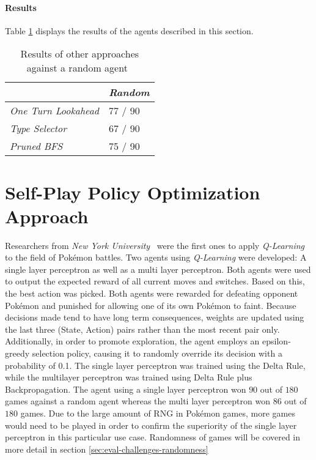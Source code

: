 \paragraph{Results}
Table \ref{tbl:AI-Comp-Results} displays the results of the agents described in this section. 
\begin{table}[h]
    \centering
        \begin{tabular}{|l|l|}
            \hline
            & \emph{Random} \\
            \hline
            \emph{One Turn Lookahead} & 77 / 90 \\
            \hline
            \emph{Type Selector} & 67 / 90 \\
            \hline
            \emph{Pruned \ac{BFS}} & 75 / 90 \\
            \hline
        \end{tabular}
        \caption{Results of other approaches against a random agent~\autocite{Lee_Togelius_2017}}
        \label{tbl:AI-Comp-Results}
\end{table}

\section{Self-Play Policy Optimization Approach}
Researchers from \textit{New York University}~\autocite{Lee_Togelius_2017} were the first ones to apply
\textit{Q-Learning} to the field of Pokémon battles. Two agents using \textit{Q-Learning}
were developed: A single layer perceptron as well as a multi layer perceptron. Both agents were 
used to output the expected reward of all current moves and switches. Based on this, the best 
action was picked. Both agents were rewarded for defeating opponent Pokémon and punished for 
allowing one of its own Pokémon to faint. Because decisions made tend to have long term consequences, 
weights are updated using the last three (State, Action) pairs rather than the most recent pair only.
Additionally, in order to promote exploration, the agent employs an epsilon-greedy selection policy, 
causing it to randomly override its decision with a probability of 0.1. The single layer perceptron 
was trained using the Delta Rule, while the multilayer perceptron was trained using Delta Rule 
plus Backpropagation. The agent using a single layer perceptron won $90$ out of $180$ games against a
random agent whereas the multi layer perceptron won 86 out of $180$ games. Due to the large amount
of \ac{RNG} in Pokémon games, more games would need to be played in order to confirm the superiority
of the single layer perceptron in this particular use case. Randomness of games will be covered
in more detail in section \ref{sec:eval-challenges-randomness}\\

